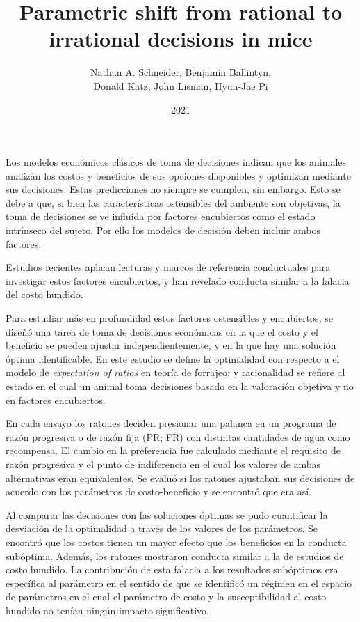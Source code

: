 \documentclass[a4paper,12pt]{article}
\title{Parametric shift from rational to irrational decisions in mice}
\author{Nathan A. Schneider, Benjamin Ballintyn,\\Donald Katz, John Lisman, Hyun-Jae Pi}
\date{2021}
\begin{document}
{\scshape\bfseries \maketitle}

Los modelos económicos clásicos de toma de decisiones indican que los animales analizan los costos y beneficios de sus opciones disponibles y optimizan mediante sus decisiones. Estas predicciones no siempre se cumplen, sin embargo. Esto se debe a que, si bien las características ostensibles del ambiente son objetivas, la toma de decisiones se ve influida por factores encubiertos como el estado intrínseco del sujeto. Por ello los modelos de decisión deben incluir ambos factores.

Estudios recientes aplican lecturas y marcos de referencia conductuales para investigar estos factores encubiertos, y han revelado conducta similar a la falacia del costo hundido.

Para estudiar más en profundidad estos factores ostensibles y encubiertos, se diseñó una tarea de toma de decisiones económicas en la que el costo y el beneficio se pueden ajustar independientemente, y en la que hay una solución óptima identificable. En este estudio se define la optimalidad con respecto a el modelo de {\itshape expectation of ratios} en teoría de forrajeo; y racionalidad se refiere al estado en el cual un animal toma decisiones basado en la valoración objetiva y no en factores encubiertos. 

En cada ensayo los ratones deciden presionar una palanca en un programa de razón progresiva o de razón fija (PR; FR) con distintas cantidades de agua como recompensa. El cambio en la preferencia fue calculado mediante el requisito de razón progresiva y el punto de indiferencia en el cual los valores de ambas alternativas eran equivalentes. Se evaluó si los ratones ajustaban sus decisiones de acuerdo con los parámetros de costo-beneficio y se encontró que era así.

Al comparar las decisiones con las soluciones óptimas se pudo cuantificar la desviación de la optimalidad a través de los valores de los parámetros. Se encontró que los costos tienen un mayor efecto que los beneficios en la conducta subóptima. Además, los ratones mostraron conducta similar a la de estudios de costo hundido. La contribución de esta falacia a los resultados subóptimos era específica al parámetro en el sentido de que se identificó un régimen en el espacio de parámetros en el cual el parámetro de costo y la susceptibilidad al costo hundido no tenían ningún impacto significativo.
\end{document}
